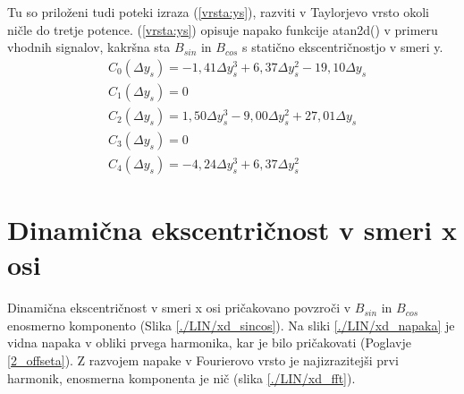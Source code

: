 Tu so priloženi tudi poteki izraza (\ref{vrsta:ys}), razviti v Taylorjevo vrsto okoli ničle do tretje potence. (\ref{vrsta:ys}) opisuje napako funkcije atan2d() v primeru vhodnih signalov, kakršna sta $B_{sin}$ in $B_{cos}$ s statično ekscentričnostjo v smeri y.
\begin{eqnarray}
&C_0(\Delta y_s) =-1,41\Delta y_s^{3}+6,37\Delta y_s^{2}-19,10\Delta y_s \\
&C_1(\Delta y_s) = 0\\
&C_2(\Delta y_s) =1,50\Delta y_s^{3}-9,00\Delta y_s^{2}+27,01\Delta y_s\\
&C_3(\Delta y_s) = 0\\
&C_4(\Delta y_s) =-4,24\Delta y_s^{3}+6,37\Delta y_s^{2}
\end{eqnarray}
\section{Dinamična ekscentričnost v smeri x osi}
Dinamična ekscentričnost v smeri x osi pričakovano povzroči v $B_{sin}$ in $B_{cos}$ enosmerno komponento (Slika \ref{./LIN/xd_sincos}).
 Na sliki \ref{./LIN/xd_napaka} je vidna napaka v obliki prvega harmonika, kar je bilo pričakovati (Poglavje \ref{2_offseta}).
Z razvojem napake v Fourierovo vrsto je najizrazitejši prvi harmonik, enosmerna komponenta je nič (slika \ref{./LIN/xd_fft}).

\newpage

